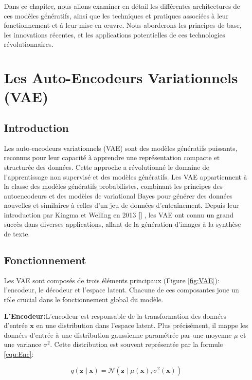 \medskip

Dans ce chapitre, nous allons examiner en détail les différentes architectures
de ces modèles génératifs, ainsi que les techniques et pratiques associées à
leur fonctionnement et à leur mise en œuvre. Nous aborderons les principes de
base, les innovations récentes, et les applications potentielles de ces
technologies révolutionnaires.

\section{Les Auto-Encodeurs Variationnels (VAE)}
\subsection{Introduction}

Les auto-encodeurs variationnels (VAE) sont des modèles génératifs puissants,
reconnus pour leur capacité à apprendre une représentation compacte et
structurée des données. Cette approche a révolutionné le domaine de
l'apprentissage non supervisé et des modèles génératifs. Les VAE appartiennent
à la classe des modèles génératifs probabilistes, combinant les principes des
autoencodeurs et des modèles de variational Bayes pour générer des données
nouvelles et similaires à celles d'un jeu de données d'entraînement. Depuis
leur introduction par Kingma et Welling en 2013
	[\cite{kingma_welling_auto_encoding}] , les VAE ont connu un grand succès dans
diverses applications, allant de la génération d'images à la synthèse de texte.

\subsection{Fonctionnement}
Les VAE sont composés de trois éléments principaux (Figure \ref{fig:VAE}):
l'encodeur, le décodeur et l'espace latent. Chacune de ces composantes joue un
rôle crucial dans le fonctionnement global du modèle.

\textbf{L'Encodeur:}L'encodeur est responsable de la transformation des données d'entrée \(\mathbf{x}\) en une distribution
dans l'espace latent. Plus précisément, il mappe les données d'entrée à une distribution gaussienne paramétrée par
une moyenne \(\mu\) et une variance \(\sigma^2\). Cette distribution est souvent représentée par la formule \ref{equ:Enc}:

\begin{equation}
	q(\mathbf{z} \mid \mathbf{x}) = \mathcal{N}(\mathbf{z} \mid \mu(\mathbf{x}), \sigma^2(\mathbf{x}))
	\label{equ:Enc}
\end{equation}

